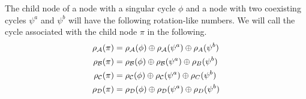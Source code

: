 \begin{theorem}
	The child node of a node with a singular cycle $\phi$ and a node with two coexisting cycles $\psi^a$ and $\psi^b$ will have the following rotation-like numbers.
	We will call the cycle associated with the child node $\pi$ in the following.
	\begin{align*}
		\rho_{\mathcal{A}}(\pi) & =
		\rho_{\mathcal{A}}(\phi) \oplus \rho_{\mathcal{A}}(\psi^a) \oplus \rho_A(\psi^b) \\
		\rho_{\mathcal{B}}(\pi) & =
		\rho_{\mathcal{B}}(\phi) \oplus \rho_{\mathcal{B}}(\psi^a) \oplus \rho_B(\psi^b) \\
		\rho_{\mathcal{C}}(\pi) & =
		\rho_{\mathcal{C}}(\phi) \oplus \rho_{\mathcal{C}}(\psi^a) \oplus \rho_C(\psi^b) \\
		\rho_{\mathcal{D}}(\pi) & =
		\rho_{\mathcal{D}}(\phi) \oplus \rho_{\mathcal{D}}(\psi^a) \oplus \rho_D(\psi^b)
	\end{align*}
\end{theorem}

